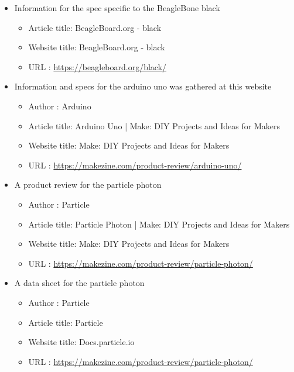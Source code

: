 \documentclass{article}
\begin{document}
\begin{thebibliography}{56}
\begin{itemize}
        \item Information for the spec specific to the BeagleBone black
        \begin{itemize}
            \item Article title: BeagleBoard.org - black
            \item Website title: BeagleBoard.org - black
            \item URL          : \url{https://beagleboard.org/black/}
        \end{itemize}

    \end{itemize}

    \begin{itemize}
        \item Information and specs for the arduino uno was gathered at this website
        \begin{itemize}
            \item Author       : Arduino
            \item Article title: Arduino Uno | Make: DIY Projects and Ideas for Makers
            \item Website title: Make: DIY Projects and Ideas for Makers
            \item URL          : \url{https://makezine.com/product-review/arduino-uno/}
        \end{itemize}
    \end{itemize}

    \begin{itemize}
        \item A product review for the particle photon
        \begin{itemize}
            \item Author       : Particle
            \item Article title: Particle Photon | Make: DIY Projects and Ideas for Makers
            \item Website title: Make: DIY Projects and Ideas for Makers
            \item URL          : \url{https://makezine.com/product-review/particle-photon/}
        \end{itemize}

        \item A data sheet for the particle photon
        \begin{itemize}
            \item Author       : Particle
            \item Article title: Particle
            \item Website title: Docs.particle.io
            \item URL          : \url{https://makezine.com/product-review/particle-photon/}
        \end{itemize}
    \end{itemize}


\end{thebibliography}
\end{document}
